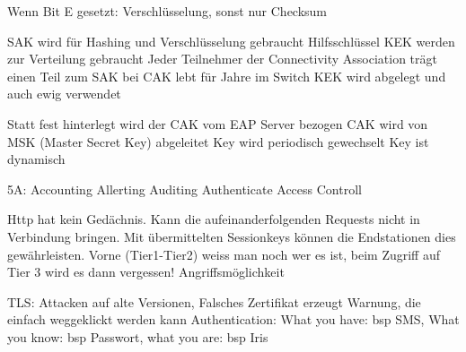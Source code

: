 \documentclass[ngerman,a4paper,12pt]{scrreprt}
\begin{document}
\ul
	\li Wenn Bit E gesetzt: Verschlüsselung, sonst nur Checksum
\ulE


\ul
	\li SAK wird für Hashing und Verschlüsselung gebraucht
	\li Hilfsschlüssel KEK werden zur Verteilung gebraucht
	\li Jeder Teilnehmer der Connectivity Association trägt einen Teil zum SAK bei
	\li CAK lebt für Jahre im Switch
	\li KEK wird abgelegt und auch ewig verwendet
	\li 
\ulE

\ul
	\li Statt fest hinterlegt wird der CAK vom EAP Server bezogen
	\li CAK wird von MSK (Master Secret Key) abgeleitet
	\li Key wird periodisch gewechselt \ra Key ist dynamisch
\ulE
{}


5A:
\ul
	\li Accounting
	\li Allerting
	\li Auditing
	\li Authenticate
	\li Access Controll
\ulE
{}

\ul
	\li Http hat kein Gedächnis. Kann die aufeinanderfolgenden Requests nicht in Verbindung bringen. Mit übermittelten Sessionkeys können die Endstationen dies gewährleisten.
	\li Vorne (Tier1-Tier2) weiss man noch wer es ist, beim Zugriff auf Tier 3 wird es dann vergessen! \ra Angriffsmöglichkeit
\ulE

\ul
	\li TLS: Attacken auf alte Versionen, Falsches Zertifikat erzeugt Warnung, die einfach weggeklickt werden kann
	\li Authentication: What you have: bsp SMS, What you know: bsp Passwort, what you are: bsp Iris
\ulE
{}
\end{document}
